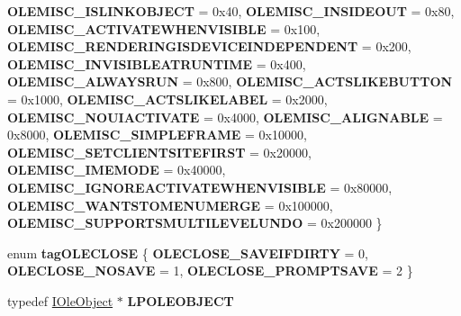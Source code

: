\begin{DoxyCompactItemize}
{\bfseries O\+L\+E\+M\+I\+S\+C\+\_\+\+I\+S\+L\+I\+N\+K\+O\+B\+J\+E\+CT} = 0x40, 
{\bfseries O\+L\+E\+M\+I\+S\+C\+\_\+\+I\+N\+S\+I\+D\+E\+O\+UT} = 0x80, 
\newline
{\bfseries O\+L\+E\+M\+I\+S\+C\+\_\+\+A\+C\+T\+I\+V\+A\+T\+E\+W\+H\+E\+N\+V\+I\+S\+I\+B\+LE} = 0x100, 
{\bfseries O\+L\+E\+M\+I\+S\+C\+\_\+\+R\+E\+N\+D\+E\+R\+I\+N\+G\+I\+S\+D\+E\+V\+I\+C\+E\+I\+N\+D\+E\+P\+E\+N\+D\+E\+NT} = 0x200, 
{\bfseries O\+L\+E\+M\+I\+S\+C\+\_\+\+I\+N\+V\+I\+S\+I\+B\+L\+E\+A\+T\+R\+U\+N\+T\+I\+ME} = 0x400, 
{\bfseries O\+L\+E\+M\+I\+S\+C\+\_\+\+A\+L\+W\+A\+Y\+S\+R\+UN} = 0x800, 
\newline
{\bfseries O\+L\+E\+M\+I\+S\+C\+\_\+\+A\+C\+T\+S\+L\+I\+K\+E\+B\+U\+T\+T\+ON} = 0x1000, 
{\bfseries O\+L\+E\+M\+I\+S\+C\+\_\+\+A\+C\+T\+S\+L\+I\+K\+E\+L\+A\+B\+EL} = 0x2000, 
{\bfseries O\+L\+E\+M\+I\+S\+C\+\_\+\+N\+O\+U\+I\+A\+C\+T\+I\+V\+A\+TE} = 0x4000, 
{\bfseries O\+L\+E\+M\+I\+S\+C\+\_\+\+A\+L\+I\+G\+N\+A\+B\+LE} = 0x8000, 
\newline
{\bfseries O\+L\+E\+M\+I\+S\+C\+\_\+\+S\+I\+M\+P\+L\+E\+F\+R\+A\+ME} = 0x10000, 
{\bfseries O\+L\+E\+M\+I\+S\+C\+\_\+\+S\+E\+T\+C\+L\+I\+E\+N\+T\+S\+I\+T\+E\+F\+I\+R\+ST} = 0x20000, 
{\bfseries O\+L\+E\+M\+I\+S\+C\+\_\+\+I\+M\+E\+M\+O\+DE} = 0x40000, 
{\bfseries O\+L\+E\+M\+I\+S\+C\+\_\+\+I\+G\+N\+O\+R\+E\+A\+C\+T\+I\+V\+A\+T\+E\+W\+H\+E\+N\+V\+I\+S\+I\+B\+LE} = 0x80000, 
\newline
{\bfseries O\+L\+E\+M\+I\+S\+C\+\_\+\+W\+A\+N\+T\+S\+T\+O\+M\+E\+N\+U\+M\+E\+R\+GE} = 0x100000, 
{\bfseries O\+L\+E\+M\+I\+S\+C\+\_\+\+S\+U\+P\+P\+O\+R\+T\+S\+M\+U\+L\+T\+I\+L\+E\+V\+E\+L\+U\+N\+DO} = 0x200000
 \}
\item 
\mbox{\label{interface_i_ole_object_a1b64be8a3f8783bbe4aa35fd92931d1a}} 
enum {\bfseries tag\+O\+L\+E\+C\+L\+O\+SE} \{ {\bfseries O\+L\+E\+C\+L\+O\+S\+E\+\_\+\+S\+A\+V\+E\+I\+F\+D\+I\+R\+TY} = 0, 
{\bfseries O\+L\+E\+C\+L\+O\+S\+E\+\_\+\+N\+O\+S\+A\+VE} = 1, 
{\bfseries O\+L\+E\+C\+L\+O\+S\+E\+\_\+\+P\+R\+O\+M\+P\+T\+S\+A\+VE} = 2
 \}
\item 
\mbox{\label{interface_i_ole_object_adc984b37a3a917a5239a70e83450bbcc}} 
typedef \hyperlink{interface_i_ole_object}{I\+Ole\+Object} $\ast$ {\bfseries L\+P\+O\+L\+E\+O\+B\+J\+E\+CT}
\item 
\mbox{\label{interface_i_ole_object_ad1be716dddbc4aae7cddfcec71ab413d}} 

\end{DoxyCompactItemize}
